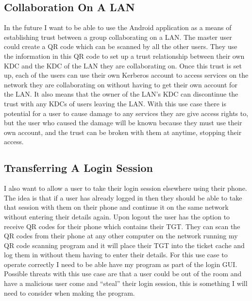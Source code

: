 \documentclass[]{report}   %
\begin{document}
\subsection{Collaboration On A LAN}
In the future I want to be able to use the Android application as a means of establishing trust between a group collaborating on a LAN. The master user could create a QR code which can be scanned by all the other users. They use the information in this QR code to set up a trust relationship between their own KDC and the KDC of the LAN they are collaborating on. Once this trust is set up, each of the users can use their own Kerberos account to access services on the network they are collaborating on without having to get their own account for the LAN. It also means that the owner of the LAN’s KDC can discontinue the trust with any KDCs of users leaving the LAN. With this use case there is potential for a user to cause damage to any services they are give access rights to, but the user who caused the damage will be known because they must use their own account, and the trust can be broken with them at anytime, stopping their access.

\subsection{Transferring A Login Session}
I also want to allow a user to take their login session elsewhere using their phone. The idea is that if a user has already logged in then they should be able to take that session with them on their phone and continue it on the same network without entering their details again. Upon logout the user has the option to receive QR codes for their phone which contains their TGT. They can scan the QR codes from their phone at any other computer on the network running my QR code scanning program and it will place their TGT into the ticket cache and log them in without them having to enter their details. For this use case to operate correctly I need to be able have my program as part of the login GUI. Possible threats with this use case are that a user could be out of the room and have a malicious user come and “steal” their login session, this is something I will need to consider when making the program.
\end{document}
